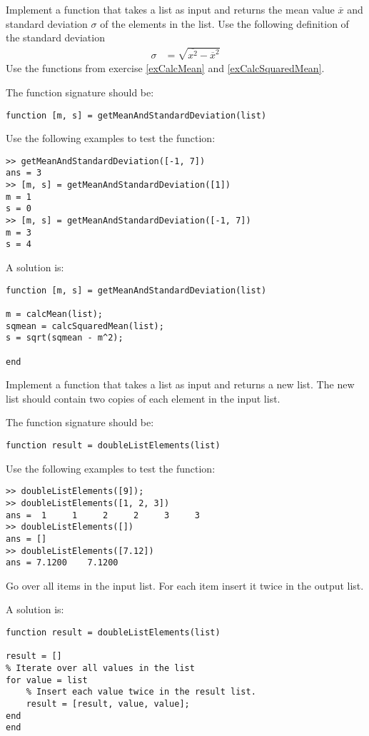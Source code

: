 \begin{ex}
Implement a function that takes a list as input and returns the mean value $\overline{x}$ and 
standard deviation $\sigma$ of the elements in the list.
Use the following definition of the standard deviation
\begin{align}
\sigma
	& = \sqrt{\overline{x^2} - \overline{x}^2}
\end{align}
Use the functions from exercise \ref{exCalcMean} and
\ref{exCalcSquaredMean}.

The function signature should be:
\begin{lstlisting}
function [m, s] = getMeanAndStandardDeviation(list)
\end{lstlisting}
Use the following examples to test the function:
\begin{lstlisting}
>> getMeanAndStandardDeviation([-1, 7])
ans = 3
>> [m, s] = getMeanAndStandardDeviation([1])
m = 1
s = 0
>> [m, s] = getMeanAndStandardDeviation([-1, 7])
m = 3
s = 4
\end{lstlisting}
\begin{hint}
\end{hint}
\begin{sol}
A solution is:
\begin{lstlisting}
function [m, s] = getMeanAndStandardDeviation(list)

m = calcMean(list);
sqmean = calcSquaredMean(list);
s = sqrt(sqmean - m^2);

end
\end{lstlisting}
\end{sol}
\end{ex}


\begin{ex}
Implement a function that takes a list as input and returns a new list.
The new list should contain two copies of each element in the input list.

The function signature should be:
\begin{lstlisting}
function result = doubleListElements(list)
\end{lstlisting}
Use the following examples to test the function:
\begin{lstlisting}
>> doubleListElements([9]);
>> doubleListElements([1, 2, 3])
ans =  1     1     2     2     3     3
>> doubleListElements([])
ans = []
>> doubleListElements([7.12])
ans = 7.1200    7.1200
\end{lstlisting}
\begin{hint}
Go over all items in the input list.
For each item insert it twice in the output list.
\end{hint}
\begin{sol}
A solution is:
\begin{lstlisting}
function result = doubleListElements(list)

result = []
% Iterate over all values in the list
for value = list
    % Insert each value twice in the result list.
    result = [result, value, value];
end
end
\end{lstlisting}
\end{sol}
\end{ex}


